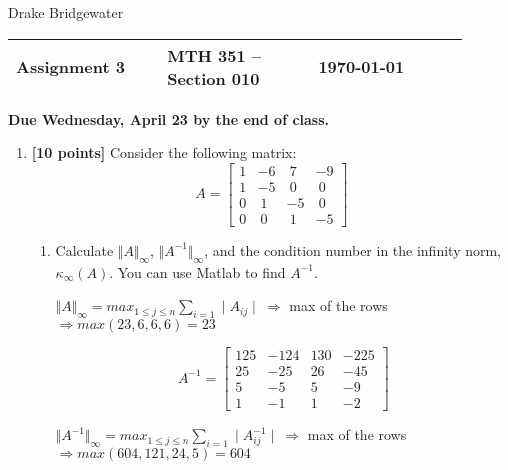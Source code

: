 \documentclass{article}
\newcommand{\myspace}{0.4cm}
\def\name{Drake Bridgewater}
\begin{document}
\hfill \name

\begin{center}

\large
\begin{tabular}{L{0.3\linewidth} C{0.3\linewidth} R{0.3\linewidth}}
\hline
Assignment 3	&MTH 351 -- Section 010		&\today \\
\hline
\end{tabular}

\vspace{\myspace}

{\bf Due Wednesday, April 23 by the end of class.}
\end{center}

\begin{enumerate}

\item {\bf [10 points]} Consider the following matrix:
\begin{equation*}
A=\begin{bmatrix}
    1    &-6     &~7   & -9\\
     1    &-5     &~0    &~0\\
     0     &~1    &-5     &~0\\
     0     &~0     &~1    &-5
\end{bmatrix}
\end{equation*}
\begin{enumerate} 
\item Calculate $\Vert A \Vert_{\infty}$,  $\Vert A^{-1} \Vert_{\infty}$, and the condition number in the infinity norm, $\displaystyle \kappa_{\infty} (A)$. You can use Matlab to find $A^{-1}$.
\begin{mdframed}[style=MyFrame]

$\Vert A \Vert_{\infty} = max_{1 \leq j \leq n} \sum_{i=1} \mid A_{ij}\mid~ \Rightarrow$ max of the rows $\Rightarrow max(23,6,6,6)= 23$

\begin{equation*}
A^{-1}=\begin{bmatrix}
   125  &-124   &130  &-225\\
    25   &-25    &26   &-45\\
     5   & -5    & 5   & -9\\
     1   & -1    & 1    &-2
\end{bmatrix}
\end{equation*}


$\Vert A^{-1} \Vert_{\infty} = max_{1 \leq j \leq n} \sum_{i=1} \mid A^{-1}_{ij}\mid~ \Rightarrow$ max of the rows $\Rightarrow max(604, 121, 24, 5)= 604$ \\


\end{mdframed}
\end{enumerate}
\end{enumerate}
\end{document}
